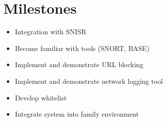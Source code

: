 \documentclass[12pt] {article}
\begin{document}
\section*{Milestones}
\begin{itemize}
    \item Integration with SNISR
    \item Become familiar with tools (SNORT, BASE)
    \item Implement and demonstrate URL blocking
    \item Implement and demonstrate network logging tool
    \item Develop whitelist
    \item Integrate system into family environment
\end{itemize}

{
  
  
}
\end{document}
